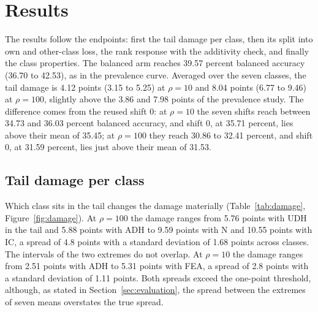 \section{Results}
\label{sec:results}
The results follow the endpoints: first the tail damage per class, then its split into own and other-class loss, the rank response with the additivity check, and finally the class properties. The balanced arm reaches 39.57 percent balanced accuracy (36.70 to 42.53), as in the prevalence curve. Averaged over the seven classes, the tail damage is 4.12 points (3.15 to 5.25) at $\rho=10$ and 8.04 points (6.77 to 9.46) at $\rho=100$, slightly above the 3.86 and 7.98 points of the prevalence study. The difference comes from the reused shift 0: at $\rho=10$ the seven shifts reach between 34.73 and 36.03 percent balanced accuracy, and shift 0, at 35.71 percent, lies above their mean of 35.45; at $\rho=100$ they reach 30.86 to 32.41 percent, and shift 0, at 31.59 percent, lies just above their mean of 31.53.

\subsection{Tail damage per class}
\label{sec:damage-results}
Which class sits in the tail changes the damage materially (Table~\ref{tab:damage}, Figure~\ref{fig:damage}). At $\rho=100$ the damage ranges from 5.76 points with UDH in the tail and 5.88 points with ADH to 9.59 points with N and 10.55 points with IC, a spread of 4.8 points with a standard deviation of 1.68 points across classes. The intervals of the two extremes do not overlap. At $\rho=10$ the damage ranges from 2.51 points with ADH to 5.31 points with FEA, a spread of 2.8 points with a standard deviation of 1.11 points. Both spreads exceed the one-point threshold, although, as stated in Section~\ref{sec:evaluation}, the spread between the extremes of seven means overstates the true spread.

